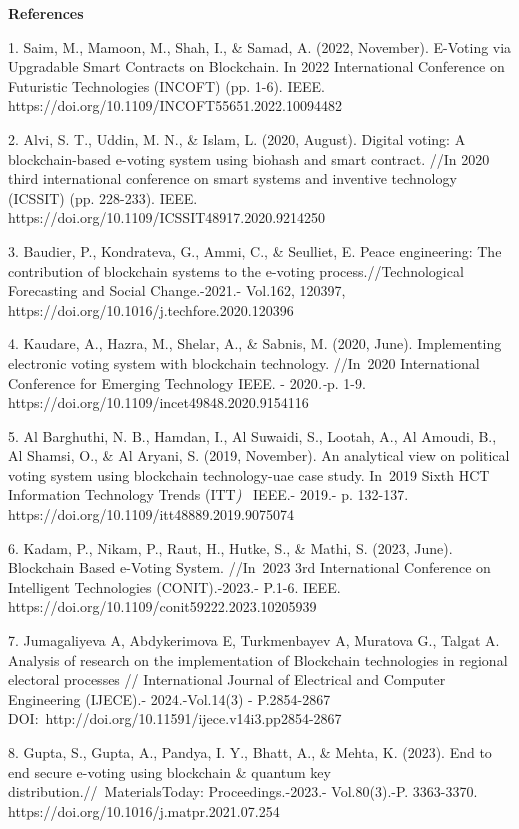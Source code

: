 \textbf{References}

1. Saim, M., Mamoon, M., Shah, I., \& Samad, A. (2022, November).
E-Voting via Upgradable Smart Contracts on Blockchain. In 2022
International Conference on Futuristic Technologies (INCOFT) (pp. 1-6).
IEEE. https://doi.org/10.1109/INCOFT55651.2022.10094482

2. Alvi, S. T., Uddin, M. N., \& Islam, L. (2020, August). Digital
voting: A blockchain-based e-voting system using biohash and smart
contract. //In 2020 third international conference on smart systems and
inventive technology (ICSSIT) (pp. 228-233). IEEE.
https://doi.org/10.1109/ICSSIT48917.2020.9214250

3. Baudier, P., Kondrateva, G., Ammi, C., \& Seulliet, E. Peace
engineering: The contribution of blockchain systems to the e-voting
process.//Technological Forecasting and Social Change.-2021.- Vol.162,
120397, https://doi.org/10.1016/j.techfore.2020.120396

4. Kaudare, A., Hazra, M., Shelar, A., \& Sabnis, M. (2020, June).
Implementing electronic voting system with blockchain technology.
//In~2020 International Conference for Emerging Technology IEEE. -
2020\emph{.-}p. 1-9. https://doi.org/10.1109/incet49848.2020.9154116

5. Al Barghuthi, N. B., Hamdan, I., Al Suwaidi, S., Lootah, A., Al
Amoudi, B., Al Shamsi, O., \& Al Aryani, S. (2019, November). An
analytical view on political voting system using blockchain
technology-uae case study. In~2019 Sixth HCT Information Technology
Trends (ITT\emph{)}~ IEEE.- 2019.- p. 132-137.
https://doi.org/10.1109/itt48889.2019.9075074

6. Kadam, P., Nikam, P., Raut, H., Hutke, S., \& Mathi, S. (2023, June).
Blockchain Based e-Voting System. //In~2023 3rd International Conference
on Intelligent Technologies (CONIT).-2023.- P.1-6. IEEE.
https://doi.org/10.1109/conit59222.2023.10205939

7. Jumagaliyeva A, Abdykerimova E, Turkmenbayev A, Muratova G., Talgat
A. Analysis of research on the implementation of Blockchain technologies
in regional electoral processes // International Journal of Electrical
and Computer Engineering (IJECE).- 2024.-Vol.14(3) - P.2854-2867
DOI:~http://doi.org/10.11591/ijece.v14i3.pp2854-2867

8. Gupta, S., Gupta, A., Pandya, I. Y., Bhatt, A., \& Mehta, K. (2023).
End to end secure e-voting using blockchain \& quantum key
distribution.//~MaterialsToday: Proceedings.-2023.- Vol.80(3).-P.
3363-3370. https://doi.org/10.1016/j.matpr.2021.07.254

